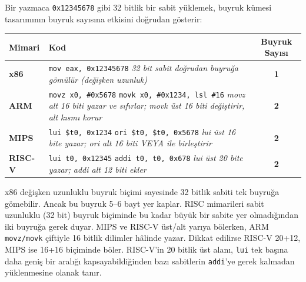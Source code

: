 \begin{karsilastirma}
Bir yazmaca \texttt{0x12345678} gibi 32 bitlik bir sabit yüklemek, buyruk kümesi tasarımının buyruk sayısına etkisini doğrudan gösterir:

\begin{center}
\footnotesize
\begin{tabular}{lp{10cm}c}
\toprule
\textbf{Mimari} & \textbf{Kod} & \textbf{Buyruk Sayısı} \\
\midrule
\textbf{x86} & \texttt{mov eax, 0x12345678} \newline \textit{\scriptsize 32 bit sabit doğrudan buyruğa gömülür (değişken uzunluk)} & \textbf{1} \\
\midrule
\textbf{ARM} & \texttt{movz x0, \#0x5678} \newline \texttt{movk x0, \#0x1234, lsl \#16} \newline \textit{\scriptsize movz alt 16 biti yazar ve sıfırlar; movk üst 16 biti değiştirir, alt kısmı korur} & \textbf{2} \\
\midrule
\textbf{MIPS} & \texttt{lui \$t0, 0x1234} \newline \texttt{ori \$t0, \$t0, 0x5678} \newline \textit{\scriptsize lui üst 16 bite yazar; ori alt 16 biti VEYA ile birleştirir} & \textbf{2} \\
\midrule
\textbf{RISC-V} & \texttt{lui t0, 0x12345} \newline \texttt{addi t0, t0, 0x678} \newline \textit{\scriptsize lui üst 20 bite yazar; addi alt 12 biti ekler} & \textbf{2} \\
\bottomrule
\end{tabular}
\end{center}

x86 değişken uzunluklu buyruk biçimi sayesinde 32 bitlik sabiti tek buyruğa gömebilir. Ancak bu buyruk 5--6 bayt yer kaplar. RISC mimarileri sabit uzunluklu (32 bit) buyruk biçiminde bu kadar büyük bir sabite yer olmadığından iki buyruğa gerek duyar. MIPS ve RISC-V üst/alt yarıya bölerken, ARM \texttt{movz/movk} çiftiyle 16 bitlik dilimler hâlinde yazar. Dikkat edilirse RISC-V 20+12, MIPS ise 16+16 biçiminde böler. RISC-V'in 20 bitlik üst alanı, \texttt{lui} tek başına daha geniş bir aralığı kapsayabildiğinden bazı sabitlerin \texttt{addi}'ye gerek kalmadan yüklenmesine olanak tanır.
\end{karsilastirma}

